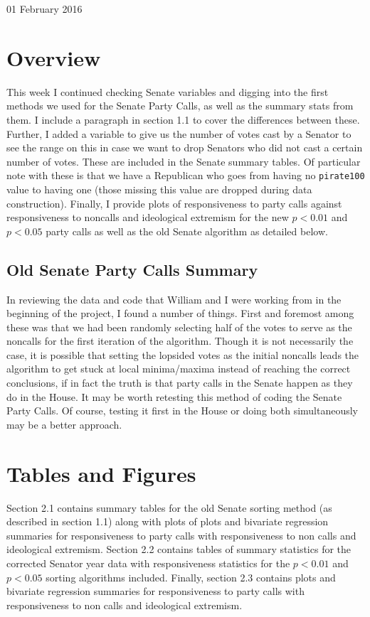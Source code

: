 \documentclass[12pt]{article}
\begin{document}
\begin{center}
\Large 01 February 2016
\end{center}

\section{Overview}

This week I continued checking Senate variables and digging into the first methods we used for the Senate Party Calls, as well as the summary stats from them. I include a paragraph in section 1.1 to cover the differences between these. Further, I added a variable to give us the number of votes cast by a Senator to see the range on this in case we want to drop Senators who did not cast a certain number of votes. These are included in the Senate summary tables. Of particular note with these is that we have a Republican who goes from having no \verb|pirate100| value to having one (those missing this value are dropped during data construction). Finally, I provide plots of responsiveness to party calls against responsiveness to noncalls and ideological extremism for the new $ p < 0.01 $ and $ p < 0.05 $ party calls as well as the old Senate algorithm as detailed below.

\subsection{Old Senate Party Calls Summary}

In reviewing the data and code that William and I were working from in the beginning of the project, I found a number of things. First and foremost among these was that we had been randomly selecting half of the votes to serve as the noncalls for the first iteration of the algorithm. Though it is not necessarily the case, it is possible that setting the lopsided votes as the initial noncalls leads the algorithm to get stuck at local minima/maxima instead of reaching the correct conclusions, if in fact the truth is that party calls in the Senate happen as they do in the House. It may be worth retesting this method of coding the Senate Party Calls. Of course, testing it first in the House or doing both simultaneously may be a better approach.


\section{Tables and Figures}

Section 2.1 contains summary tables for the old Senate sorting method (as described in section 1.1) along with plots of plots and bivariate regression summaries for responsiveness to party calls with responsiveness to non calls and ideological extremism.
Section 2.2 contains tables of summary statistics for the corrected Senator year data with responsiveness statistics for the $ p < 0.01 $ and $ p < 0.05 $ sorting algorithms included. Finally, section 2.3 contains plots and bivariate regression summaries for responsiveness to party calls with responsiveness to non calls and ideological extremism.
\end{document}
